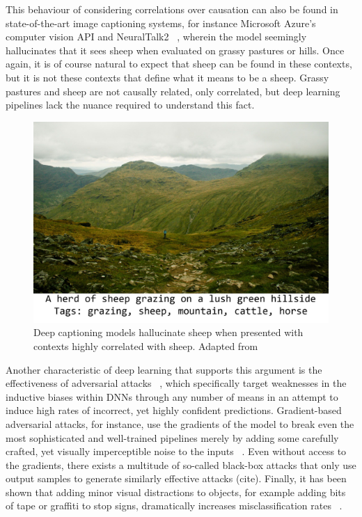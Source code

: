 	This behaviour of considering correlations over causation can also be found in state-of-the-art image captioning systems, for instance Microsoft Azure's computer vision API and NeuralTalk2 ~\cite{electric_sheep}, wherein the model seemingly hallucinates that it sees sheep when evaluated on grassy pastures or hills. Once again, it is of course natural to expect that sheep can be found in these contexts, but it is not these contexts that define what it means to be a sheep. Grassy pastures and sheep are not causally related, only correlated, but deep learning pipelines lack the nuance required to understand this fact. 
	\begin{figure}[ht]
		\includegraphics[width=\linewidth]{illustrations/sheep.jpg}
		\caption{Deep captioning models hallucinate sheep when presented with contexts highly correlated with sheep. Adapted from ~\cite{electric_sheep}}
		\label{sheep}
	\end{figure}


	Another characteristic of deep learning that supports this argument is the effectiveness of adversarial attacks ~\cite{adversarial_bugs_features}, which specifically target weaknesses in the inductive biases within DNNs through any number of means in an attempt to induce high rates of incorrect, yet highly confident predictions. Gradient-based adversarial attacks, for instance, use the gradients of the model to break even the most sophisticated and well-trained pipelines merely by adding some carefully crafted, yet visually imperceptible noise to the inputs ~\cite{adversarial_attacks}. Even without access to the gradients, there exists a multitude of so-called black-box attacks that only use output samples to generate similarly effective attacks (cite). Finally, it has been shown that adding minor visual distractions to objects, for example adding bits of tape or graffiti to stop signs, dramatically increases misclassification rates ~\cite{physical_attacks}. 
	

